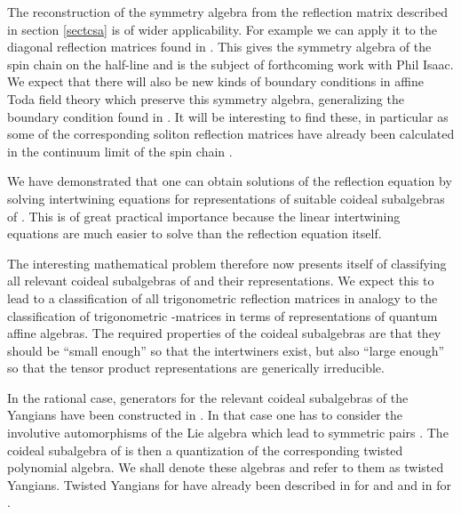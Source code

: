 \documentclass[a4paper,12pt]{article}
\providecommand{\uqgh}{U_q(\hat{g})}
\numberwithin{equation}{section}
\begin{document}
The reconstruction of the symmetry algebra from the reflection
matrix described in section \ref{sectcsa} is of wider
applicability. For example we can apply it to the diagonal
reflection matrices \coordHE{} found in \cite{dev93}. This gives the symmetry
algebra of the \coordHE{} spin chain on the half-line and is the
subject of forthcoming work with Phil Isaac. We expect that there
will also be new kinds of boundary conditions in affine Toda field
theory which preserve this symmetry algebra, generalizing the
boundary condition found in \cite{Del98b}. It will be interesting
to find these, in particular as some of the corresponding soliton
reflection matrices have already been calculated in the continuum
limit of the \coordHE{} spin chain \cite{Doi99}.

We have demonstrated that one can obtain solutions of the
reflection equation by solving intertwining equations for
representations of suitable coideal subalgebras of \myHighlight{$\uqgh$}\coordHE{}. This
is of great practical importance because the linear intertwining
equations are much easier to solve than the reflection equation
itself.

The interesting mathematical problem therefore now presents itself
of classifying all relevant coideal subalgebras of \myHighlight{$\uqgh$}\coordHE{} and
their representations. We expect this to lead to a classification
of all trigonometric reflection matrices in analogy to the
classification of trigonometric \coordHE{}-matrices in terms of
representations of quantum affine algebras. The required
properties of the coideal subalgebras are that they should be
``small enough'' so that the intertwiners exist, but also ``large
enough'' so that the tensor product representations are
generically irreducible.

In the rational case, generators for the relevant coideal
subalgebras of the Yangians \coordHE{} have been constructed in
\cite{Del01}. In that case one has to consider the involutive
automorphisms \myHighlight{$\sigma$}\coordHE{} of the Lie algebra \coordHE{} which lead to
symmetric pairs \coordHE{}. The coideal subalgebra of \coordHE{}
is then a quantization of the corresponding twisted polynomial
algebra. We shall denote these algebras \coordHE{} and refer
to them as twisted Yangians. Twisted Yangians for \coordHE{} have
already been described in \cite{Mol96} for \coordHE{} and
\coordHE{} and in \cite{Min99} for \coordHE{}.
\end{document}
